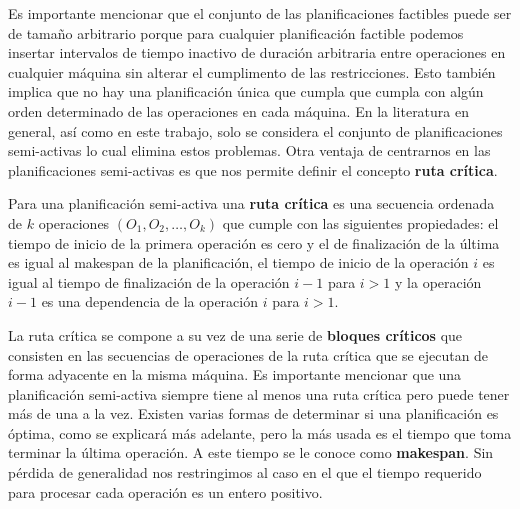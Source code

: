 Es importante mencionar que el conjunto de las planificaciones factibles puede ser de tamaño arbitrario porque para cualquier planificación factible podemos insertar intervalos de tiempo inactivo de duración arbitraria entre operaciones en cualquier máquina sin alterar el cumplimento de las restricciones. Esto también implica que no hay una planificación única que cumpla que cumpla con algún orden determinado de las operaciones en cada máquina. En la literatura en general, así como en este trabajo, solo se considera el conjunto de planificaciones semi-activas lo cual elimina estos problemas. 
%
Otra ventaja de centrarnos en las planificaciones semi-activas es que nos permite definir el concepto \textbf{ruta crítica}. 

%
Para una planificación semi-activa una \textbf{ruta crítica} es una secuencia ordenada de $k$ operaciones $(O_1,O_2,\dots,O_k)$ que cumple con las siguientes propiedades: el tiempo de inicio de la primera operación es cero y el de finalización de la última es igual al makespan de la planificación, el tiempo de inicio de la operación $i$ es igual al tiempo de finalización de la operación $i-1$ para $i>1$ y la operación $i-1$ es una dependencia de la operación $i$ para $i>1$.  

%
La ruta crítica se compone a su vez de una serie de \textbf{bloques críticos} que consisten en las secuencias de operaciones de la ruta crítica que se ejecutan de forma 
adyacente en la misma máquina. 
%
Es importante mencionar que una planificación semi-activa siempre tiene al menos una ruta crítica pero puede tener más de una a la vez.
%
Existen varias formas de determinar si una planificación es óptima, como se explicará más adelante, pero la más usada es el tiempo que toma terminar la última operación.
%
A este tiempo se le conoce como \textbf{makespan}. 
%
Sin pérdida de generalidad nos restringimos al caso en el que el tiempo requerido para procesar cada operación es un entero positivo.


